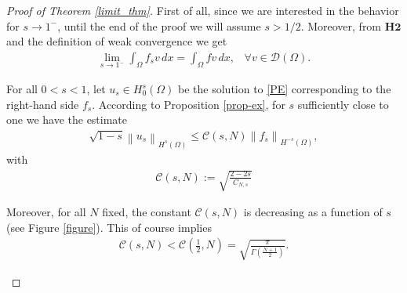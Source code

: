 \documentclass[reqno,twoside]{amsart}
\numberwithin{equation}{section}
\newcommand{\norm}[2]{{\left\|#1\right\|}_{#2}}
\newcommand{\cns}{C_{N,s}}
\begin{document}
\begin{proof}[Proof of Theorem \ref{limit_thm}]
First of all, since we are interested in the behavior for $s\to 1^-$, until the end of the proof we will assume $s> 1/2$.  
Moreover, from $\textbf{H2}$ and the definition of weak convergence we get 
\begin{align}\label{limit-rhs}
	\lim_{s\to 1^-}\int_{\Omega} f_sv\,dx = \int_{\Omega} fv\,dx, \;\;\; \forall v\in\mathcal{D}(\Omega).
\end{align}

For all $0<s<1$, let $u_s\in H_0^s(\Omega)$ be the solution to \eqref{PE} corresponding to the right-hand side $f_s$. According to Proposition \ref{prop-ex}, for $s$ sufficiently close to one we have the estimate
\begin{align}\label{norm_est}
	\sqrt{1-s}\norm{u_s}{H^s(\Omega)}\leq\mathcal{C}(s,N)\norm{f_s}{H^{-s}(\Omega)},
\end{align}
with 
\begin{align*}
	\mathcal{C}(s,N) := \sqrt{\frac{2-2s}{\cns}}
\end{align*}

Moreover, for all $N$ fixed, the constant $\mathcal{C}(s,N)$ is decreasing as a function of $s$ (see Figure \ref{figure}). This of course implies
\begin{align*}
	\mathcal{C}(s,N) < \mathcal{C}\left(\frac 12,N\right) = \sqrt{\frac{\pi}{\Gamma\left(\frac{N+1}{2}\right)}}.
\end{align*}

\begin{figure}[h]
\centering
{}
%
\end{figure}
\end{proof}
\end{document}
